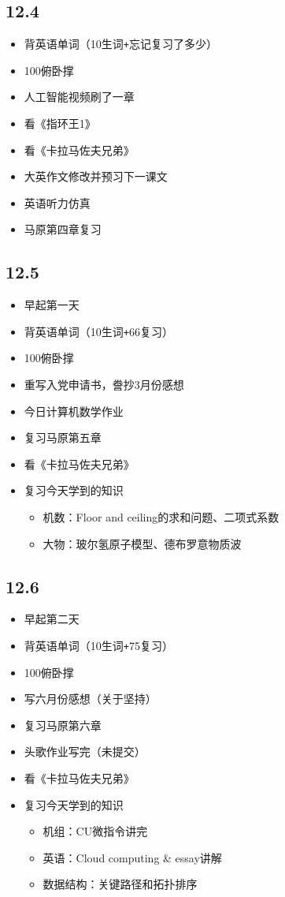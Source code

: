 \documentclass[UTF8]{ctexart}
\begin{document}
\subsection*{12.4}
\begin{itemize}
    \item 背英语单词（10生词\verb|+|忘记复习了多少）
    \item 100俯卧撑
    \item 人工智能视频刷了一章
    \item 看《指环王1》
    \item 看《卡拉马佐夫兄弟》
    \item 大英作文修改并预习下一课文
    \item 英语听力仿真
    \item 马原第四章复习
\end{itemize}
\subsection*{12.5}
\begin{itemize}
    \item 早起第一天
    \item 背英语单词（10生词\verb|+|66复习）
    \item 100俯卧撑
    \item 重写入党申请书，誊抄3月份感想
    \item 今日计算机数学作业
    \item 复习马原第五章
    \item 看《卡拉马佐夫兄弟》
    \item 复习今天学到的知识
          \begin{itemize}
              \item 机数：Floor and ceiling的求和问题、二项式系数
              \item 大物：玻尔氢原子模型、德布罗意物质波
          \end{itemize}
\end{itemize}
\subsection*{12.6}
\begin{itemize}
    \item 早起第二天
    \item 背英语单词（10生词\verb|+|75复习）
    \item 100俯卧撑
    \item 写六月份感想（关于坚持）
    \item 复习马原第六章
    \item 头歌作业写完（未提交）
    \item 看《卡拉马佐夫兄弟》
    \item 复习今天学到的知识
          \begin{itemize}
              \item 机组：CU微指令讲完
              \item 英语：Cloud computing \& essay讲解
              \item 数据结构：关键路径和拓扑排序
          \end{itemize}
\end{itemize}
\end{document}
